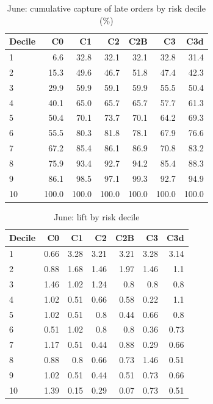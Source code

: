\begin{table}[htbp]
\centering
\small
\caption{June: cumulative capture of late orders by risk decile (\%)}
\begin{tabular}{lrrrrrr}
\toprule
Decile & C0 & C1 & C2 & C2B & C3 & C3d \\
\midrule
1 & 6.6 & 32.8 & 32.1 & 32.1 & 32.8 & 31.4 \\
2 & 15.3 & 49.6 & 46.7 & 51.8 & 47.4 & 42.3 \\
3 & 29.9 & 59.9 & 59.1 & 59.9 & 55.5 & 50.4 \\
4 & 40.1 & 65.0 & 65.7 & 65.7 & 57.7 & 61.3 \\
5 & 50.4 & 70.1 & 73.7 & 70.1 & 64.2 & 69.3 \\
6 & 55.5 & 80.3 & 81.8 & 78.1 & 67.9 & 76.6 \\
7 & 67.2 & 85.4 & 86.1 & 86.9 & 70.8 & 83.2 \\
8 & 75.9 & 93.4 & 92.7 & 94.2 & 85.4 & 88.3 \\
9 & 86.1 & 98.5 & 97.1 & 99.3 & 92.7 & 94.9 \\
10 & 100.0 & 100.0 & 100.0 & 100.0 & 100.0 & 100.0 \\
\bottomrule
\end{tabular}
\par\smallskip\begin{minipage}{\linewidth}\footnotesize \end{minipage}
\end{table}


\begin{table}[htbp]
\centering
\small
\caption{June: lift by risk decile}
\begin{tabular}{lrrrrrr}
\toprule
Decile & C0 & C1 & C2 & C2B & C3 & C3d \\
\midrule
1 & 0.66 & 3.28 & 3.21 & 3.21 & 3.28 & 3.14 \\
2 & 0.88 & 1.68 & 1.46 & 1.97 & 1.46 & 1.1 \\
3 & 1.46 & 1.02 & 1.24 & 0.8 & 0.8 & 0.8 \\
4 & 1.02 & 0.51 & 0.66 & 0.58 & 0.22 & 1.1 \\
5 & 1.02 & 0.51 & 0.8 & 0.44 & 0.66 & 0.8 \\
6 & 0.51 & 1.02 & 0.8 & 0.8 & 0.36 & 0.73 \\
7 & 1.17 & 0.51 & 0.44 & 0.88 & 0.29 & 0.66 \\
8 & 0.88 & 0.8 & 0.66 & 0.73 & 1.46 & 0.51 \\
9 & 1.02 & 0.51 & 0.44 & 0.51 & 0.73 & 0.66 \\
10 & 1.39 & 0.15 & 0.29 & 0.07 & 0.73 & 0.51 \\
\bottomrule
\end{tabular}
\par\smallskip\begin{minipage}{\linewidth}\footnotesize \end{minipage}
\end{table}

